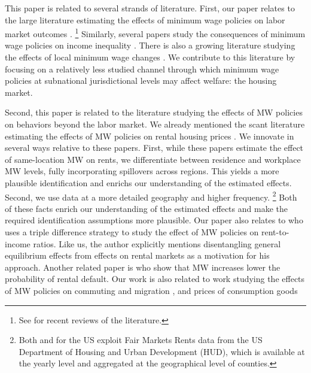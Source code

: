 
This paper is related to several strands of literature.
First, our paper relates to the large literature estimating the effects of 
minimum wage policies on labor market outcomes
\parencite{CardKrueger1994, NeumarkWascher2007,MeerWest2016,CegnizEtAl2019}.%
\footnote{See \textcite{Dube2019, NeumarkShirley2021} for recent reviews of the 
literature.}
Similarly, several papers study the consequences of minimum wage policies on 
income inequality \parencite{Lee1999, AutorEtAl2016}.
There is also a growing literature studying the effects of local minimum wage 
changes \parencite{DubeNaiduReich2007,SchmittRosnick2011,DubeLindner2021}.
We contribute to this literature by focusing on a relatively less studied 
channel through which minimum wage policies at subnational jurisdictional 
levels may affect welfare: the housing market.

Second, this paper is related to the literature studying the effects of MW 
policies on behaviors beyond the labor market.
We already mentioned the scant literature estimating the effects of MW policies
on rental housing prices \parencite{Tidemann2018, Yamagishi2021}.
We innovate in several ways relative to these papers.
First, while these papers estimate the effect of same-location MW on rents, we 
differentiate between residence and workplace MW levels, fully incorporating
spillovers across regions.
This yields a more plausible identification and enrichs our understanding of
the estimated effects.
Second, we use data at a more detailed geography and higher frequency.%
\footnote{Both \textcite{Tidemann2018} and \textcite{Yamagishi2019} for the US 
exploit Fair Markets Rents data from the US Department of Housing and Urban 
Development (HUD), which is available at the yearly level and aggregated at the 
geographical level of counties.}
Both of these facts enrich our understanding of the estimated effects and make 
the required identification assumptions more plausible.
Our paper also relates to \textcite{Hughes2020} who uses a triple difference 
strategy to study the effect of MW policies on rent-to-income ratios. Like us, 
the author explicitly mentions disentangling general equilibrium effects from 
effects on rental markets as a motivation for his approach.%
Another related paper is \textcite{AgarwalEtAl2021} who show that MW increases 
lower the probability of rental default.
Our work is also related to work studying the effects of MW policies on 
commuting and migration \parencite{Cadena2014, Monras2019, PerezPerez2021}, and 
prices of consumption goods \parencite{AllegrettoReich2018, Leung2021}

